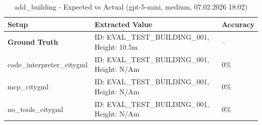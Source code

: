 \documentclass[a4paper,11pt]{article}
\begin{document}
\begin{table}[H]
\centering
\scriptsize
\caption{add\_building - Expected vs Actual (gpt-5-mini, medium, 07.02.2026 18:02)}
\begin{tabular}{l l l}
\toprule
Setup & Extracted Value & Accuracy \\
\midrule
\textbf{Ground Truth} & ID: EVAL\_TEST\_BUILDING\_001, Height: 10.5m & -- \\
\midrule
code\_interpreter\_citygml & ID: EVAL\_TEST\_BUILDING\_001, Height: N/Am & 0\% \\
mcp\_citygml & ID: EVAL\_TEST\_BUILDING\_001, Height: N/Am & 0\% \\
no\_tools\_citygml & ID: EVAL\_TEST\_BUILDING\_001, Height: N/Am & 0\% \\
\bottomrule
\end{tabular}
\end{table}

\clearpage
\end{document}
